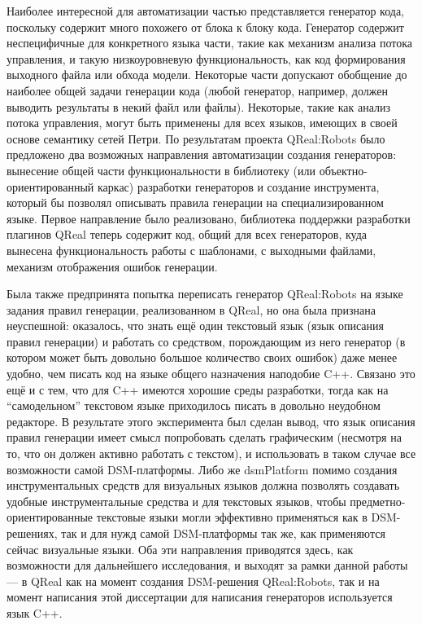 Наиболее интересной для автоматизации частью представляется генератор кода, поскольку 
содержит много похожего от блока к блоку кода. Генератор содержит неспецифичные для 
конкретного языка части, такие как механизм анализа потока управления, и такую низкоуровневую 
функциональность, как код формирования выходного файла или обхода модели. Некоторые 
части допускают обобщение до наиболее общей задачи генерации кода (любой генератор, 
например, должен выводить результаты в некий файл или файлы). Некоторые, такие как 
анализ потока управления, могут быть применены для всех языков, имеющих в своей основе 
семантику сетей Петри. По результатам проекта QReal:Robots было предложено два возможных 
направления автоматизации создания генераторов: вынесение общей части функциональности 
в библиотеку (или объектно-ориентированный каркас) разработки генераторов и создание 
инструмента, который бы позволял описывать правила генерации на специализированном 
языке.  Первое направление было реализовано, библиотека поддержки разработки плагинов 
QReal теперь содержит код, общий для всех генераторов, куда вынесена функциональность 
работы с шаблонами, с выходными файлами, механизм отображения ошибок генерации. 

Была также предпринята попытка переписать генератор QReal:Robots на языке задания 
правил генерации, реализованном в QReal, но она была признана неуспешной: оказалось, 
что знать ещё один текстовый язык (язык описания правил генерации) и работать со средством, 
порождающим из него генератор (в котором может быть довольно большое количество своих ошибок) 
даже менее удобно, чем писать код на языке общего назначения наподобие C++. Связано это 
ещё и с тем, что для C++ имеются хорошие среды разработки, тогда как на "`самодельном"' 
текстовом языке приходилось писать в довольно неудобном редакторе. В результате этого 
эксперимента был сделан вывод, что язык описания правил генерации имеет смысл попробовать 
сделать графическим (несмотря на то, что он должен активно работать с текстом), и использовать 
в таком случае все возможности самой \ac{DSM}-платформы. Либо же \ac{dsmPlatform} помимо 
создания инструментальных средств для визуальных языков должна позволять создавать удобные инструментальные средства 
и для текстовых языков, чтобы предметно-ориентированные текстовые языки могли эффективно 
применяться как в \ac{DSM}-решениях, так и для нужд самой \ac{DSM}-платформы так же, как применяются 
сейчас визуальные языки. Оба эти направления приводятся здесь, как возможности для 
дальнейшего исследования, и выходят за рамки данной работы --- в QReal как на момент 
создания \ac{DSM}-решения QReal:Robots, так и на момент написания этой диссертации для 
написания генераторов используется язык C++.

